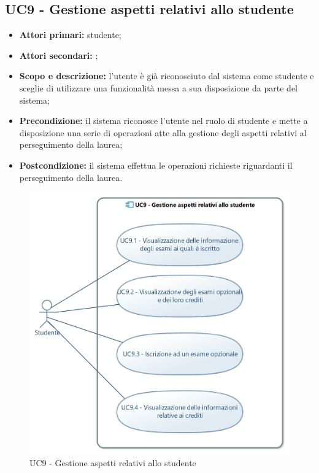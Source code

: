 \documentclass[AnalisiDeiRequisiti.tex]{subfiles}
\begin{document}
\subsection{UC9 - Gestione aspetti relativi allo studente}
\begin{itemize}
	\item \textbf{Attori primari:} studente;
	\item \textbf{Attori secondari:} ;
	\item \textbf{Scopo e descrizione:} l'utente è già riconosciuto dal sistema come studente e sceglie di utilizzare una funzionalità messa a sua disposizione da parte del sistema;
	\item \textbf{Precondizione:} il sistema riconosce l'utente nel ruolo di studente e mette a disposizione una serie di operazioni atte alla gestione degli aspetti relativi al perseguimento della laurea;
	\item \textbf{Postcondizione:} il sistema effettua le operazioni richieste riguardanti il perseguimento della laurea.
\end{itemize}
\begin{figure}[H]
	\centering
	\includegraphics[width=0.8\linewidth]{UC9.jpg}
	\caption{UC9 - Gestione aspetti relativi allo studente}
	\label{fig:UC9 - Gestione aspetti relativi allo studente}
\end{figure}
\end{document}
